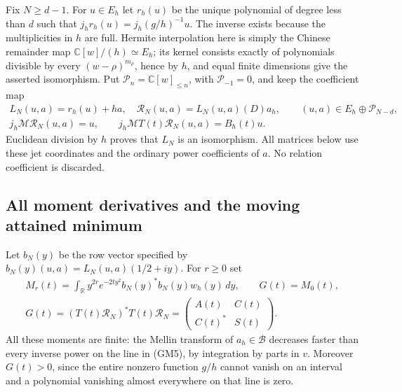 Fix $N\geq d-1$.  For $u\in E_h$ let $r_h(u)$ be the unique
polynomial of degree less than $d$ such that
$j_h r_h(u)=j_h(g/h)^{-1}u$.  The inverse exists because the
multiplicities in $h$ are full.  Hermite interpolation here is simply
the Chinese remainder map $\mathbb C[w]/(h)\simeq E_h$; its kernel
consists exactly of polynomials divisible by every
$(w-\rho)^{m_\rho}$, hence by $h$, and equal finite dimensions give
the asserted isomorphism.  Put $\mathcal P_n=\mathbb C[w]_{\leq n}$,
with $\mathcal P_{-1}=0$, and keep the coefficient map
\begin{equation}\tag{GM4}
 \begin{gathered}
 L_N(u,a)=r_h(u)+ha,\quad
 \mathcal R_N(u,a)=L_N(u,a)(D)a_h,\qquad
 (u,a)\in E_h\oplus\mathcal P_{N-d},\\
 j_h\mathcal M\mathcal R_N(u,a)=u,\qquad
 j_h\mathcal M T(t)\mathcal R_N(u,a)=B_h(t)u.
 \end{gathered}
\end{equation}
Euclidean division by $h$ proves that $L_N$ is an isomorphism.  All
matrices below use these jet coordinates and the ordinary power
coefficients of $a$.  No relation coefficient is discarded.

\subsection{All moment derivatives and the moving attained minimum}

Let $b_N(y)$ be the row vector specified by
$b_N(y)(u,a)=L_N(u,a)(1/2+iy)$.  For $r\geq0$ set
\begin{equation}\tag{GM5}
 \begin{gathered}
 M_r(t)=\int_{\mathbb R}y^{2r}e^{-2ty^2}
                       b_N(y)^*b_N(y)w_h(y)\,dy,\qquad
 G(t)=M_0(t),\\
 G(t)=(T(t)\mathcal R_N)^*T(t)\mathcal R_N
       =\begin{pmatrix}A(t)&C(t)\\ C(t)^*&S(t)\end{pmatrix}.
 \end{gathered}
\end{equation}
All these moments are finite: the Mellin transform of $a_h\in\mathscr B$
decreases faster than every inverse power on the line in (GM5), by
integration by parts in $v$.  Moreover $G(t)>0$, since the entire
nonzero function $g/h$ cannot vanish on an interval and a polynomial
vanishing almost everywhere on that line is zero.

